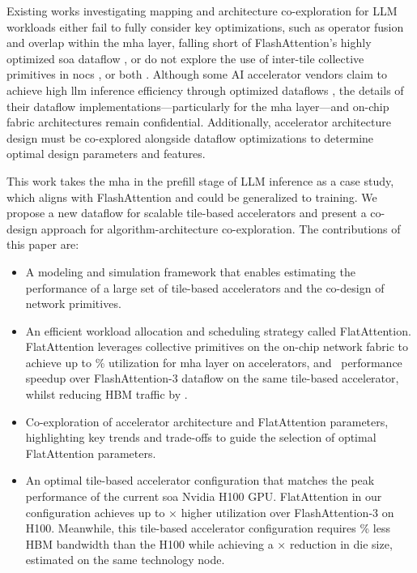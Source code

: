 \documentclass[conference]{IEEEtran}
\begin{document}
Existing works investigating mapping and architecture co-exploration for LLM workloads either fail to fully consider key optimizations, such as operator fusion and overlap within the \gls{mha} layer, falling short of FlashAttention's highly optimized \gls{soa} dataflow \cite{thuning2024}, or do not explore the use of inter-tile collective primitives in \glspl{noc} \cite{kao2023, nayak2024fusemax}, or both \cite{cai2024}.
Although some AI accelerator vendors claim to achieve high \gls{llm} inference efficiency through optimized dataflows \cite{prabhakar2024b, lie2024}, the details of their dataflow implementations—particularly for the \gls{mha} layer—and on-chip fabric architectures remain confidential. Additionally, accelerator architecture design must be co-explored alongside dataflow optimizations to determine optimal design parameters and features.

This work takes the \gls{mha} in the prefill stage of LLM inference as a case study, which aligns with FlashAttention\cite{dao2022} and could be generalized to training. We propose a new dataflow for scalable tile-based accelerators and present a co-design approach for algorithm-architecture co-exploration. The contributions of this paper are:
\begin{itemize}
    \item A modeling and simulation framework that enables estimating the performance of a large set of tile-based accelerators and the co-design of network primitives.
    \item An efficient workload allocation and scheduling strategy called FlatAttention. FlatAttention leverages collective primitives on the on-chip network fabric to achieve up to \MaxUti\% utilization for \gls{mha} layer on \arch accelerators, and  \OptFlatPerfSU\texttimes\ performance speedup over FlashAttention-3 dataflow on the same tile-based accelerator, whilst reducing HBM traffic by \OptFlatHBMTraficSave\texttimes.
    \item Co-exploration of accelerator architecture and FlatAttention parameters, highlighting key trends and trade-offs to guide the selection of optimal FlatAttention parameters.
    \item An optimal tile-based accelerator configuration that matches the peak performance of the current \gls{soa} Nvidia H100 GPU.
    FlatAttention in our configuration achieves up to \SUtoNV× higher utilization over FlashAttention-3 on H100.
    Meanwhile, this tile-based accelerator configuration requires \BWreducetoNV\% less HBM bandwidth than the H100 while achieving a \DieSave× reduction in die size, estimated on the same technology node.
\end{itemize}
\end{document}
